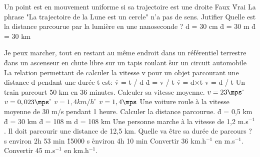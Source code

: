 
\q
Un point est en mouvement uniforme si sa trajectoire est une droite
\rv
Faux
\r
Vrai
\q
La phrase "La trajectoire de la Lune est un cercle" n'a pas de sens.
Jutifier
\q
Quelle est la distance parcourue par la lumière en une nanoseconde ?
\rv
d = 30 cm
\r
d = 30 m
\r
d = 30 km

  \q
  Je peux marcher, tout en restant au même endroit dans un référentiel terrestre
  \r 
  dans un ascenseur en chute libre
  \rv
           sur un tapis roulant
   \r
       sur un circuit automobile
  \q
  La relation permettant de calculer la vitesse v pour un objet parcourant une distance d pendant une durée t est:
  \r
       v = t / d
  \r
       d = v / t
  \r
       v = d×t
  \rv
       v = d / t
  \q
  Un train parcourt 50 km en 36 minutes. Calculer sa vitesse moyenne.
       \rv
       $v = 23 \mps$
       \r
       $v = 0,023 \mps$
       \r
       $v = 1,4 km/h$
       \r
       $v = 1,4 \mps$
   \q
   Une voiture roule à la vitesse moyenne de 30 m/s pendant 1 heure. Calculer la distance parcourue.
       \r
       d = 0,5 km
       \r
       d = 30 km
       \r
       d = 108 m
       \rv 
       d = 108 km
   \q
   Une personne marche à la vitesse de 1,2 m.s$^{-1}$. Il doit parcourir une distance de 12,5 km. Quelle va être sa durée de parcours ? 
        s
       \rv
       environ 2h 53 min
       \r
       15000 s
       \r
       environ 4h 10 min
   \q
   Convertir 36 km.h$^{-1}$ en m.s$^{-1}$.
 \q
   Convertir 45 m.s$^{-1}$ en km.h$^{-1}$.
